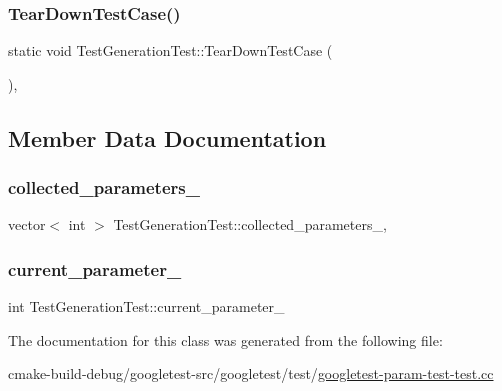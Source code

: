 \mbox{\label{classTestGenerationTest_ab0f077f3b881d66e3676741761222732}} 
\subsubsection{\texorpdfstring{TearDownTestCase()}{TearDownTestCase()}}
{\footnotesize\ttfamily static void Test\+Generation\+Test\+::\+Tear\+Down\+Test\+Case (\begin{DoxyParamCaption}{ }\end{DoxyParamCaption})\hspace{0.3cm}{\ttfamily [inline]}, {\ttfamily [static]}}



\subsection{Member Data Documentation}
\mbox{\label{classTestGenerationTest_a16dfa6f4b445c7e4a7a9611b34b7a7a2}} 
\subsubsection{\texorpdfstring{collected\_parameters\_}{collected\_parameters\_}}
{\footnotesize\ttfamily vector$<$ int $>$ Test\+Generation\+Test\+::collected\+\_\+parameters\+\_\+\hspace{0.3cm}{\ttfamily [static]}, {\ttfamily [protected]}}

\mbox{\label{classTestGenerationTest_a2d149b987b6dfe86ffbfae677199b0cd}} 
\subsubsection{\texorpdfstring{current\_parameter\_}{current\_parameter\_}}
{\footnotesize\ttfamily int Test\+Generation\+Test\+::current\+\_\+parameter\+\_\+\hspace{0.3cm}{\ttfamily [protected]}}



The documentation for this class was generated from the following file\+:\begin{DoxyCompactItemize}
\item 
cmake-\/build-\/debug/googletest-\/src/googletest/test/\mbox{\hyperlink{googletest-param-test-test_8cc}{googletest-\/param-\/test-\/test.\+cc}}\end{DoxyCompactItemize}

